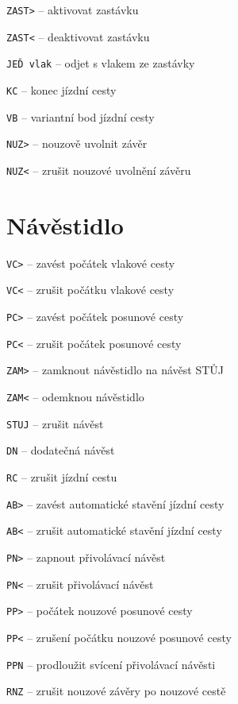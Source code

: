 \documentclass[12pt,a4paper,landscape]{article}
\begin{document}
\begin{multicols}{3}
\begin{compactitem}
	\item \texttt{ZAST>} -- aktivovat zastávku
	\item \texttt{ZAST<} -- deaktivovat zastávku
	\item \texttt{JEĎ vlak} -- odjet s vlakem ze zastávky
	
	\item \texttt{KC} -- konec jízdní cesty
	\item \texttt{VB} -- variantní bod jízdní cesty
	
	\item \texttt{NUZ>} -- nouzově uvolnit závěr
	\item \texttt{NUZ<} -- zrušit nouzové uvolnění závěru	
\end{compactitem}	

\section{Návěstidlo}
\begin{compactitem}
	\item \texttt{VC>} -- zavést počátek vlakové cesty
	\item \texttt{VC<} -- zrušit počátku vlakové cesty
	\item \texttt{PC>} -- zavést počátek posunové cesty
	\item \texttt{PC<} -- zrušit počátek posunové cesty
	\item \texttt{ZAM>} -- zamknout návěstidlo na návěst STŮJ
	\item \texttt{ZAM<} -- odemknou návěstidlo
	\item \texttt{STUJ} -- zrušit návěst
	\item \texttt{DN} -- dodatečná návěst
	\item \texttt{RC} -- zrušit jízdní cestu
	\item \texttt{AB>} -- zavést automatické stavění jízdní cesty
	\item \texttt{AB<} -- zrušit automatické stavění jízdní cesty
	\item \texttt{PN>} -- zapnout přivolávací návěst
	\item \texttt{PN<} -- zrušit přivolávací návěst
	\item \texttt{PP>} -- počátek nouzové posunové cesty
	\item \texttt{PP<} -- zrušení počátku nouzové posunové cesty
	\item \texttt{PPN} -- prodloužit svícení přivolávací návěsti
	\item \texttt{RNZ} -- zrušit nouzové závěry po nouzové cestě
\end{compactitem}	


\end{multicols}
\end{document}
